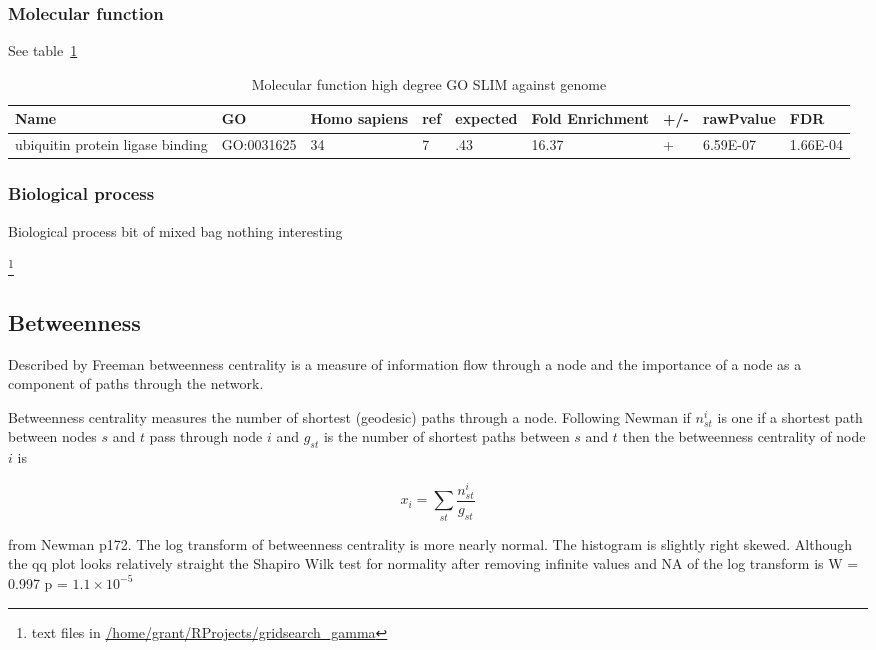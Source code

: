 \subsubsection{Molecular function}
See table~\ref{tab:Molecular function high degree GO SLIM against genome}
\begin{table}
\centering
\begin{adjustbox}{max width=\textwidth}
\begin{tabular}{lllllllll}
  Name & GO&	Homo sapiens &ref &	expected &	Fold Enrichment &	+/-	&rawPvalue&FDR\\
  \hline
ubiquitin protein ligase binding&GO:0031625&	34&	7&	.43&	16.37&	+&	6.59E-07&	1.66E-04\\
\end{tabular}
\end{adjustbox}
\caption{Molecular function high degree GO SLIM against genome}
\label{tab:Molecular function high degree GO SLIM against genome}
\end{table}

\subsubsection{Biological process}
Biological process bit of mixed bag nothing interesting 

\footnote{text files in \url{/home/grant/RProjects/gridsearch_gamma}}
\subsection{Betweenness}
\label{sec:Betweeness centrality}
Described by Freeman \cite{freeman1977set} betweenness centrality is a measure of information flow through a node and the importance of a node as a component of paths through the network. 

Betweenness centrality measures the number of shortest (geodesic) paths through a node. Following Newman if $n_{st}^i$ is one if a shortest path between nodes $s$ and $t$ pass through node $i$ and $g_{st}$ is the number of shortest paths between $s$ and $t$ then the betweenness centrality of node $i$ is

\begin{equation}
    x_i = \sum_{st} \frac{n_{st}^i}{g_{st}}
\end{equation}
\label{eq: Betweenness centrality}

from Newman \cite{newman2018networks} p172. 
The log transform of betweenness centrality is more nearly normal. The histogram is slightly right skewed.
Although the qq plot looks relatively straight the Shapiro Wilk test for normality after removing infinite values and NA of the log transform  is 
W = 0.997 p = $1.1 \times 10^{-5}$

